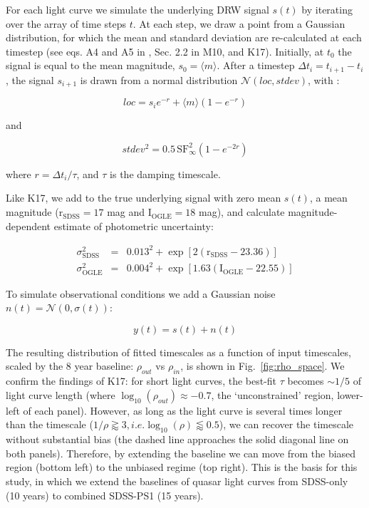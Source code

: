 \documentclass[twocolumn]{aastex62}
\begin{document}
For each light curve we simulate the underlying DRW signal $s(t)$ by iterating over the array of time steps $t$.  At each step, we draw a point from a Gaussian distribution, for which the mean and standard deviation are re-calculated at each timestep (see eqs. A4 and A5 in \citealt{kelly2009}, Sec. 2.2 in M10, and K17). Initially, at $t_{0}$ the signal is equal to the mean magnitude, $s_{0} = \langle m \rangle$. After a timestep $\Delta t_{i} = t_{i+1} - t_{i}$, the signal $s_{i+1}$ is drawn from  a normal distribution $\mathcal{N}(loc, stdev)$, with : 

\begin{equation}
loc = s_{i} e ^ { - r  }  + \langle m \rangle \left( 1 - e ^{ - r }\right)
\end{equation}

and 

\begin{equation}
stdev^{2} =  0.5  \, \mathrm{SF}_{\infty}^{2} \left( 1 - e ^{  - 2 r  }  \right)
\end{equation}

where  $r = \Delta t_{i} / \tau$, and $\tau$ is the damping timescale.


Like K17, we add to the true underlying signal with zero mean $s(t)$, a mean magnitude  ($\mathrm{r_{SDSS}}=17$ mag and $\mathrm{I_{OGLE}}=18$ mag), and calculate magnitude-dependent estimate of photometric uncertainty:

\begin{eqnarray}
\sigma_{\mathrm{SDSS}}^{2} &=& 0.013^{2} + \exp{[2 (\mathrm{r_{SDSS}}-23.36)]} \\
\sigma_{\mathrm{OGLE}}^{2} &=& 0.004^{2} + \exp{[1.63 (\mathrm{I_{OGLE}} - 22.55)]}
\end{eqnarray}

To simulate observational conditions  we add a Gaussian noise $n(t) = \mathcal{N}(0,\sigma(t))$:

\begin{equation}
y(t) = s(t) + n(t) 
\end{equation}

The resulting distribution of fitted timescales  as a function of input timescales, scaled by the  8 year baseline: $\rho_{out}$ vs $\rho_{in}$, is shown in Fig.~\ref{fig:rho_space}. We confirm the findings of K17: for short light curves, the best-fit $\tau$ becomes $\sim 1/5$ of light curve length (where $\log_{10}{(\rho_{out})} \approx -0.7$, the `unconstrained' region, lower-left of each panel). However, as long as the light curve is several times longer than the timescale ($1/\rho \gtrapprox 3, i.e. \log_{10}{(\rho)} \lessapprox 0.5$), we can recover the timescale without substantial bias (the dashed line approaches the solid diagonal line on both panels). Therefore, by extending the baseline we can move from the biased region (bottom left) to the unbiased regime (top right). This is the basis for this study,  in which we extend the baselines of quasar light curves from SDSS-only (10 years) to combined SDSS-PS1 (15 years). 
\end{document}
